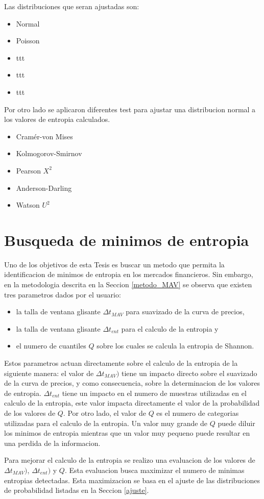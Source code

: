 Las distribuciones que seran ajustadas son:

\begin{itemize}
	\item Normal
	\item Poisson
	\item ttt
	\item ttt
	\item ttt
\end{itemize}


Por otro lado se aplicaron diferentes test para ajustar una distribucion normal a los valores de entropia calculados.
\begin{itemize}
	\item Cramér-von Mises
	\item Kolmogorov-Smirnov
	\item Pearson $X^2$
	\item Anderson-Darling
	\item Watson $U^2$
\end{itemize}



\section{Busqueda de minimos de entropia}

Uno de los objetivos de esta Tesis es buscar un metodo que permita la identificacion de minimos de entropia en los mercados financieros.
Sin embargo, en la metodologia descrita en la Seccion \ref{metodo_MAV} se observa que existen tres parametros dados por el usuario:
\begin{itemize}
	\item la talla de ventana glisante $\Delta t_{MAV}$ para suavizado de la curva de precios,
	\item la talla de ventana glisante $\Delta t_{ent}$ para el calculo de la entropia y
	\item el numero de cuantiles $Q$ sobre los cuales se calcula la entropia de Shannon.
\end{itemize}

Estos parametros actuan directamente sobre el calculo de la entropia de la siguiente manera: 
el valor de $\Delta t_{MAV})$ tiene un impacto directo sobre el suavizado de la curva de precios, y como consecuencia, sobre la determinacion de los valores de entropia. 
$\Delta t_{ent}$ tiene un impacto en el numero de muestras utilizadas en el calculo de la entropia, este valor impacta directamente el valor de la probabilidad de los valores de $Q$. 
Por otro lado, el valor de $Q$ es el numero de categorias utilizadas para el calculo de la entropia. 
Un valor muy grande de $Q$ puede diluir los minimos de entropia mientras que un valor muy pequeno puede resultar en una perdida de la informacion.

Para mejorar el calculo de la entropia se realizo una evaluacion de los valores de $\Delta t_{MAV})$, $\Delta t_{ent})$ y $Q$.
Esta evaluacion busca maximizar el numero de minimas entropias detectadas.
Esta maximizacion se basa en el ajuste de las distribuciones de probabilidad listadas en la Seccion \ref{ajuste}.




	

